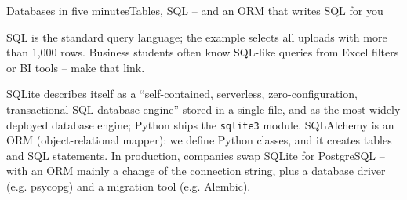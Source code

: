 \documentclass[aspectratio=169,11pt]{beamer}
\begin{document}
\begin{frame}[fragile]{Databases in five minutes}{Tables, SQL -- and an ORM that writes SQL for you}
{  SQL is the standard query language; the example selects all uploads with more than 1,000 rows. Business students often know SQL-like queries from Excel filters or BI tools -- make that link.\par
  SQLite describes itself as a ``self-contained, serverless, zero-configuration, transactional SQL database engine'' stored in a single file, and as the most widely deployed database engine; Python ships the \texttt{sqlite3} module. SQLAlchemy is an ORM (object-relational mapper): we define Python classes, and it creates tables and SQL statements. In production, companies swap SQLite for PostgreSQL -- with an ORM mainly a change of the connection string, plus a database driver (e.g. psycopg) and a migration tool (e.g. Alembic).}
\end{frame}

\end{document}
